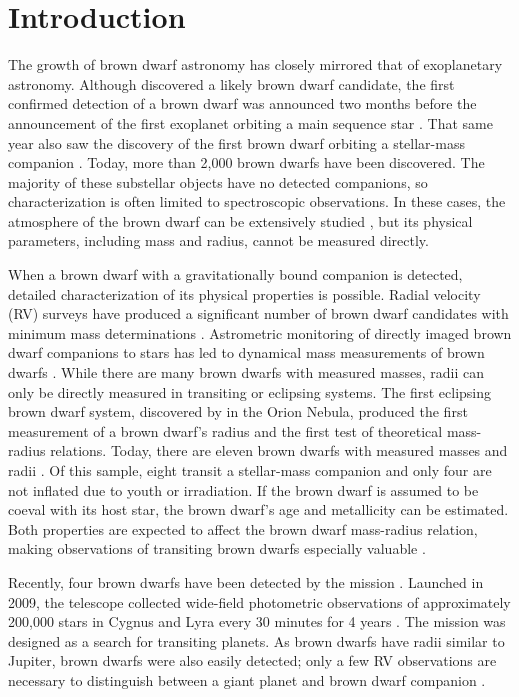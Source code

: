 
\section{Introduction}
\label{sec:intro-4}

The growth of brown dwarf astronomy has closely mirrored that of exoplanetary astronomy.
Although \citet{Latham89} discovered a likely brown dwarf candidate, the first confirmed detection of a brown dwarf was announced two months before the announcement of the first exoplanet orbiting a main sequence star \citep{Mayor95, Rebolo95}. 
That same year also saw the discovery of the first brown dwarf orbiting a stellar-mass companion \citep{Nakajima95}. 
Today, more than 2,000 brown dwarfs have been discovered.
The majority of these substellar objects have no detected companions, so characterization is often limited to spectroscopic observations.
In these cases, the atmosphere of the brown dwarf can be extensively studied \citep[e.g.][]{Burgasser14, Faherty14}, but its physical parameters, including mass and radius, cannot be measured directly.

When a brown dwarf with a gravitationally bound companion is detected, detailed characterization of its physical properties is possible. 
Radial velocity (RV) surveys have produced a significant number of brown dwarf candidates with minimum mass determinations \citep[e.g.][]{Patel07}. 
Astrometric monitoring of directly imaged brown dwarf companions to stars has led to dynamical mass measurements of brown dwarfs \citep{Liu02, Dupuy09, Crepp12a}.
While there are many brown dwarfs with measured masses, radii can only be directly measured in transiting or eclipsing systems.
The first eclipsing brown dwarf system, discovered by \citet{Stassun06} in the Orion Nebula, produced the first measurement of a brown dwarf's radius and the first test of theoretical mass-radius relations.
Today, there are eleven brown dwarfs with measured masses and radii \citep{Diaz14b}. 
Of this sample, eight transit a stellar-mass companion and only four are not inflated due to youth or irradiation.
If the brown dwarf is assumed to be coeval with its host star, the brown dwarf's age and metallicity can be estimated. Both properties are expected to affect the brown dwarf mass-radius relation, making observations of transiting brown dwarfs especially valuable \citep{Burrows11}. 

Recently, four brown dwarfs have been detected by the \itk{} mission \citep{Bouchy11b, Johnson11a, Diaz13, Moutou13}.
Launched in 2009, the \itk{} telescope collected wide-field photometric observations of approximately 200,000 stars in Cygnus and Lyra every 30 minutes for 4 years \citep{Borucki10}. 
The mission was designed as a search for transiting planets.
As brown dwarfs have radii similar to Jupiter, brown dwarfs were also easily detected; only a few RV observations are necessary to distinguish between a giant planet and brown dwarf companion \citep[e.g.][]{Moutou13}.

